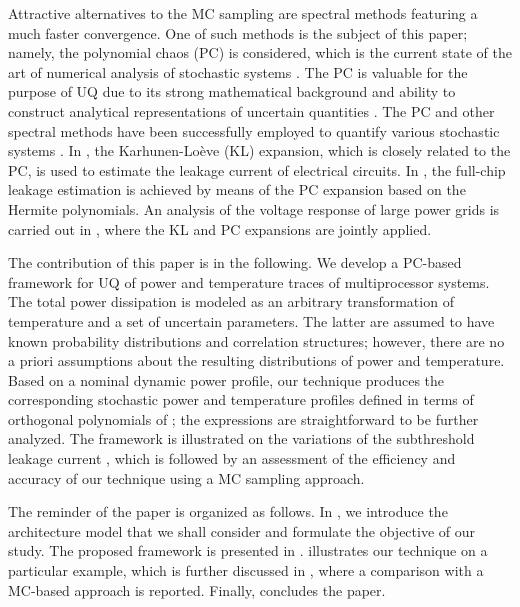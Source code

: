 Attractive alternatives to the MC sampling are spectral methods \cite{xiu2010, maitre2010, ghanem1991} featuring a much faster convergence. One of such methods is the subject of this paper; namely, the polynomial chaos (PC) is considered, which is the current state of the art of numerical analysis of stochastic systems \cite{xiu2010}. The PC is valuable for the purpose of UQ due to its strong mathematical background and ability to construct analytical representations of uncertain quantities \cite{eldred2009}. The PC and other spectral methods have been successfully employed to quantify various stochastic systems \cite{xiu2010}. In \cite{bhardwaj2006}, the Karhunen-Lo\`{e}ve (KL) expansion, which is closely related to the PC, is used to estimate the leakage current of electrical circuits. In \cite{shen2009}, the full-chip leakage estimation is achieved by means of the PC expansion based on the Hermite polynomials. An analysis of the voltage response of large power grids is carried out in \cite{ghanta2006}, where the KL and PC expansions are jointly applied.

The contribution of this paper is in the following. We develop a PC-based framework for UQ of power and temperature traces of multiprocessor systems. The total power dissipation is modeled as an arbitrary transformation of temperature and a set of uncertain parameters. The latter are assumed to have known probability distributions and correlation structures; however, there are no a priori assumptions about the resulting distributions of power and temperature. Based on a nominal dynamic power profile, our technique produces the corresponding stochastic power and temperature profiles defined in terms of orthogonal polynomials of \rvs; the expressions are straightforward to be further analyzed. The framework is illustrated on the variations of the subthreshold leakage current \cite{srivastava2010}, which is followed by an assessment of the efficiency and accuracy of our technique using a MC sampling approach.

The reminder of the paper is organized as follows. In , we introduce the architecture model that we shall consider and formulate the objective of our study. The proposed framework is presented in .  illustrates our technique on a particular example, which is further discussed in , where a comparison with a MC-based approach is reported. Finally,  concludes the paper.
